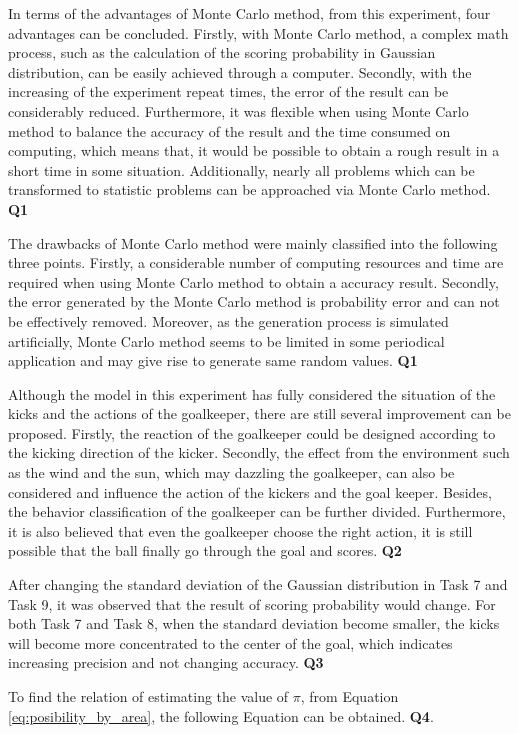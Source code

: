 \documentclass[11pt, a4paper]{article}
\begin{document}
In terms of the advantages of Monte Carlo method, from this experiment, four advantages can be concluded. Firstly, with Monte Carlo method, a complex math process, such as the calculation of the scoring probability in Gaussian distribution, can be easily achieved through a computer. Secondly, with the increasing of the experiment repeat times, the error of the result can be considerably reduced. Furthermore, it was flexible when using Monte Carlo method to balance the accuracy of the result and the time consumed on computing, which means that, it would be possible to obtain a rough result in a short time in some situation. Additionally, nearly all problems which can be transformed to statistic problems can be approached via Monte Carlo method. \textbf{Q1}

The drawbacks of Monte Carlo method were mainly classified into the following three points. Firstly, a considerable number of computing resources and time are required when using Monte Carlo method to obtain a accuracy result. Secondly, the error generated by the Monte Carlo method is probability error and can not be effectively removed. Moreover, as the generation process is simulated artificially, Monte Carlo method seems to be limited in some periodical application and may give rise to generate same random values. \textbf{Q1}

Although the model in this experiment has fully considered the situation of the kicks and the actions of the goalkeeper, there are still several improvement can be proposed. Firstly, the reaction of the goalkeeper could be designed according to the kicking direction of the kicker. Secondly, the effect from the environment such as the wind and the sun, which may dazzling the goalkeeper, can also be considered and influence the action of the kickers and the goal keeper. Besides, the behavior classification of the goalkeeper can be further divided. Furthermore, it is also believed that even the goalkeeper choose the right action, it is still possible that the ball finally go through the goal and scores. \textbf{Q2}

After changing the standard deviation of the Gaussian distribution in Task 7 and Task 9, it was observed that the result of scoring probability would change. For both Task 7 and Task 8, when the standard deviation become smaller, the kicks will become more concentrated to the center of the goal, which indicates increasing precision and not changing accuracy. \textbf{Q3}

To find the relation of estimating the value of $\pi$, from Equation \ref{eq:posibility_by_area}, the following Equation can be obtained. \textbf{Q4}.
\end{document}
